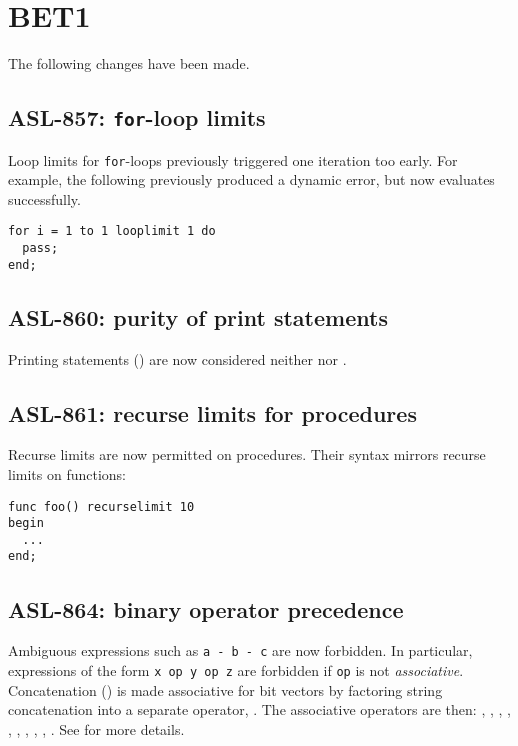 \section{BET1}

The following changes have been made.

\subsection{ASL-857: \texttt{for}-loop limits}

Loop limits for \texttt{for}-loops previously triggered one iteration too early.
For example, the following previously produced a dynamic error, but now evaluates successfully.

\begin{lstlisting}
for i = 1 to 1 looplimit 1 do
  pass;
end;
\end{lstlisting}

\subsection{ASL-860: purity of print statements}

Printing statements () are now considered neither \pureterm{} nor \readonlyterm{}.

\subsection{ASL-861: recurse limits for procedures}

Recurse limits are now permitted on procedures.
Their syntax mirrors recurse limits on functions:
\begin{lstlisting}
func foo() recurselimit 10
begin
  ...
end;
\end{lstlisting}

\subsection{ASL-864: binary operator precedence}

Ambiguous expressions such as \texttt{a - b - c} are now forbidden.
In particular, expressions of the form \texttt{x op y op z} are forbidden if \texttt{op} is not \emph{associative}.
Concatenation (\Tcoloncolon) is made associative for bit vectors by factoring string concatenation into a separate operator, \Tplusplus.
The associative operators are then:
\Tplus, \Tmul, \Tband, \Tbor, \Tand, \Tor, \Txor, \Tbeq, \Tplusplus, \Tcoloncolon.
See  for more details.
